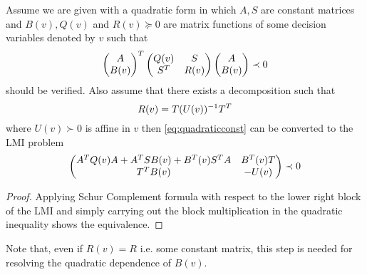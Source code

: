 \begin{lem}\label{lem:linlemma} Assume we are given with a quadratic form in which $A,S$ are constant matrices and $B(v),Q(v)$ 
and $R(v)\succeq 0$ are matrix functions of some decision variables denoted by $v$ such that
\begin{equation}
\begin{pmatrix}A\\B(v)\end{pmatrix}^T\begin{pmatrix}Q(v) &S\\S^T &R(v)\end{pmatrix}\begin{pmatrix}A\\B(v)\end{pmatrix} \prec 0
\label{eq:quadraticconst}
\end{equation}
should be verified. Also assume that there exists a decomposition such that 
\[R(v) = T(U(v))^{-1}T^T\] where $U(v)\succ 0 $ is affine in $v$ then 
\eqref{eq:quadraticconst} can be converted to the LMI problem
\begin{equation}
\begin{pmatrix}A^TQ(v)A + A^TSB(v) + B^T(v)S^TA &B^T(v)T\\T^TB(v) &-U(v)\end{pmatrix}\prec 0
\label{eq:linearizedconst}
\end{equation}
\end{lem}

\begin{proof} Applying Schur Complement formula with respect to the lower right block of the LMI and simply carrying out the block
multiplication in the quadratic inequality shows the equivalence. 
\end{proof}
Note that, even if $R(v)=R$ i.e. some constant matrix, this step is needed for resolving the quadratic dependence of $B(v)$. 

